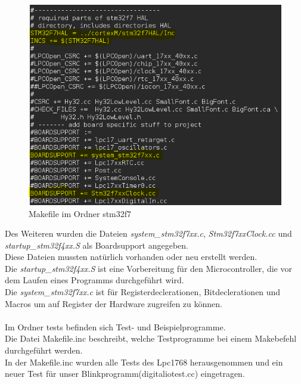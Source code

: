 \begin{figure}[h]
\begin{center}
\includegraphics[width=13cm]{grafiken/Makefile_stm32f7_1.png}
\caption{Makefile im Ordner stm32f7}
\label{Makefile_stm32f7}
\end{center}
\end{figure}
\noindent
Des Weiteren wurden die Dateien {\textit{system\_stm32f7xx.c}}, {\textit{Stm32f7xxClock.cc}} und {\textit{startup\_stm32f4xx.S}} als Boardsupport angegeben.\\
Diese Dateien mussten natürlich vorhanden oder neu erstellt werden.\\
Die {\textit{startup\_stm32f4xx.S}} ist eine Vorbereitung für den Microcontroller, die vor dem Laufen eines Programms durchgeführt wird.\\ 
Die {\textit{system\_stm32f7xx.c}} ist für Registerdeclerationen, Bitdeclerationen und Macros um auf Register der Hardware zugreifen zu können.\\
\\
\newpage
\noindent
Im Ordner tests befinden sich Test- und Beispielprogramme.\\
Die Datei Makefile.inc beschreibt, welche Testprogramme bei einem Makebefehl durchgeführt werden.\\
In der Makefile.inc wurden alle Tests des Lpc1768 herausgenommen und ein neuer Test für unser Blinkprogramm(digitaliotest.cc) eingetragen.\\
